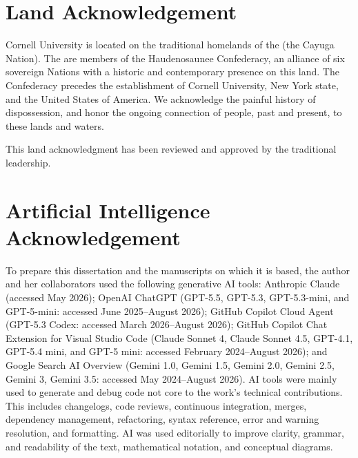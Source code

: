 


\section*{Land Acknowledgement}
Cornell University is located on the traditional homelands of the \cayuga (the Cayuga Nation).
The \cayuga are members of the Haudenosaunee Confederacy, an alliance of six sovereign Nations with a historic and contemporary presence on this land.
The Confederacy precedes the establishment of Cornell University, New York state, and the United States of America.
We acknowledge the painful history of \cayuga dispossession,
and honor the ongoing connection of \cayuga people, past and present, to these lands and waters.

This land acknowledgment has been reviewed and approved by the traditional \cayuga leadership.

\section*{Artificial Intelligence Acknowledgement}

To prepare this dissertation and the manuscripts on which it is based, the author and her collaborators used the following generative AI tools:
Anthropic Claude (accessed May 2026);
OpenAI ChatGPT (GPT-5.5, GPT-5.3, GPT-5.3-mini, and GPT-5-mini: accessed June 2025--August 2026);
GitHub Copilot Cloud Agent (GPT-5.3 Codex: accessed March 2026--August 2026);
GitHub Copilot Chat Extension for Visual Studio Code (Claude Sonnet 4, Claude Sonnet 4.5, GPT-4.1, GPT-5.4 mini, and GPT-5 mini: accessed February 2024--August 2026); and
Google Search AI Overview (Gemini 1.0, Gemini 1.5, Gemini 2.0, Gemini 2.5, Gemini 3, Gemini 3.5: accessed May 2024--August 2026).
AI tools were mainly used to generate and debug code not core to the work's technical contributions.
This includes changelogs, code reviews, continuous integration, merges, dependency management, refactoring, syntax reference, error and warning resolution, and formatting.
AI was used editorially to improve clarity, grammar, and readability of the text, mathematical notation, and conceptual diagrams.

